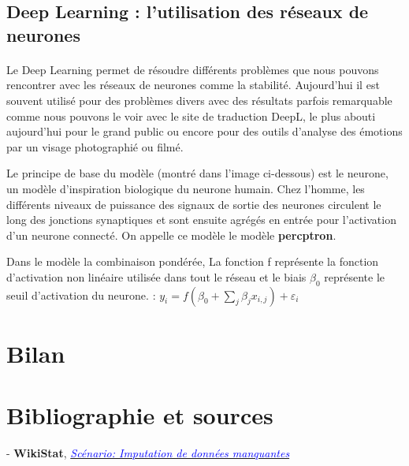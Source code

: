 \documentclass[14pt, openany]{article}
\begin{document}
\subsection{Deep Learning : l'utilisation des réseaux de neurones}
\paragraph{}
Le Deep Learning permet de résoudre différents problèmes que nous pouvons rencontrer avec les réseaux de neurones comme la stabilité. Aujourd'hui il est souvent utilisé pour des problèmes divers avec des résultats parfois remarquable comme nous pouvons le voir avec le site de traduction DeepL, le plus abouti aujourd'hui pour le grand public ou encore pour des outils d'analyse des émotions par un visage photographié ou filmé.

Le principe de base du modèle (montré dans l'image ci-dessous) est le neurone, un modèle d'inspiration biologique du neurone humain. Chez l'homme, les différents niveaux de puissance des signaux de sortie des neurones circulent le long des jonctions synaptiques et sont ensuite agrégés en entrée pour l'activation d'un neurone connecté. On appelle ce modèle le modèle \textbf{percptron}.

Dans le modèle la combinaison pondérée, La fonction f représente la fonction d'activation non linéaire utilisée dans tout le réseau et le biais $\beta_{0} $ représente le seuil d'activation du neurone. :
$y_{i}=f(\beta_{0} + \sum\limits_{j} \beta_{j}x_{i,j}) + \varepsilon_{i}$

\section{Bilan}

\section{Bibliographie et sources}

\begin{flushleft}
- \textbf{WikiStat}, \href{https://www.math.univ-toulouse.fr/~besse/Wikistat/pdf/st-scenar-app-idm.pdf}{\textit{\textcolor{blue}{Scénario: Imputation de données manquantes}}}\\
\medskip
\end{flushleft}
\end{document}

